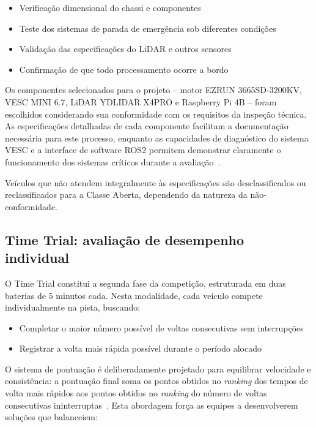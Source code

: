 \begin{itemize}
      \item Verificação dimensional do chassi e componentes
      \item Teste dos sistemas de parada de emergência sob diferentes condições
      \item Validação das especificações do LiDAR e outros sensores
      \item Confirmação de que todo processamento ocorre a bordo
\end{itemize}

Os componentes selecionados para o projeto – motor EZRUN 3665SD-3200KV, VESC
MINI 6.7, LiDAR YDLIDAR X4PRO e Raspberry Pi 4B – foram escolhidos considerando
sua conformidade com os requisitos da inspeção técnica. As especificações
detalhadas de cada componente facilitam a documentação necessária para este
processo, enquanto as capacidades de diagnóstico do sistema VESC e a interface
de software ROS2 permitem demonstrar claramente o funcionamento dos sistemas
críticos durante a avaliação~\cite{F1TENTHRules2023}.

Veículos que não atendem integralmente às especificações são desclassificados
ou reclassificados para a Classe Aberta, dependendo da natureza da
não-conformidade.

\subsection{Time Trial: avaliação de desempenho individual}

O Time Trial constitui a segunda fase da competição, estruturada em duas
baterias de 5 minutos cada. Nesta modalidade, cada veículo compete
individualmente na pista, buscando:

\begin{itemize}
      \item Completar o maior número possível de voltas consecutivas sem interrupções
      \item Registrar a volta mais rápida possível durante o período alocado
\end{itemize}

O sistema de pontuação é deliberadamente projetado para equilibrar velocidade e
consistência: a pontuação final soma os pontos obtidos no \emph{ranking} dos
tempos de volta mais rápidos aos pontos obtidos no \emph{ranking} do número de
voltas consecutivas ininterruptas~\cite{F1TENTHRules2023}. Esta
abordagem força as equipes a desenvolverem soluções que balanceiem:

